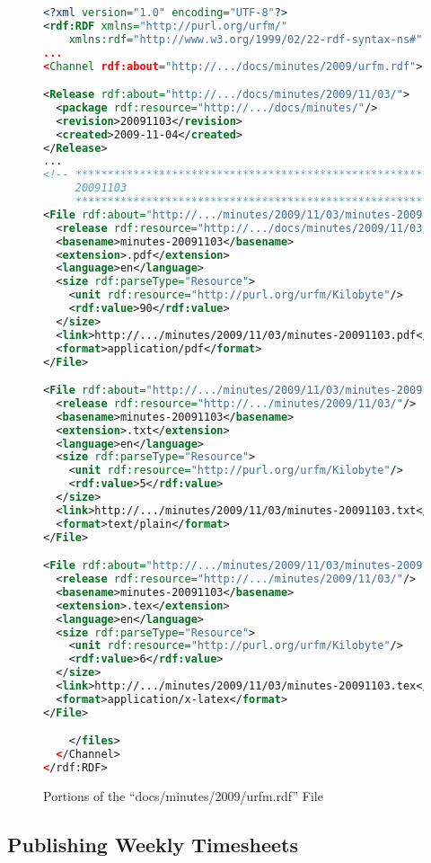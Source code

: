 \begin{figure}\caption{Portions of the ``docs/minutes/2009/urfm.rdf'' File}
\label{WebsitePublishingMinutesMetadataURFM}
\begin{lstlisting}[language=XML]
<?xml version="1.0" encoding="UTF-8"?>
<rdf:RDF xmlns="http://purl.org/urfm/"
    xmlns:rdf="http://www.w3.org/1999/02/22-rdf-syntax-ns#"
...
<Channel rdf:about="http://.../docs/minutes/2009/urfm.rdf">

<Release rdf:about="http://.../docs/minutes/2009/11/03/">
  <package rdf:resource="http://.../docs/minutes/"/>
  <revision>20091103</revision>
  <created>2009-11-04</created>
</Release>
...
<!-- *********************************************************
     20091103                                                 
     ********************************************************* -->
<File rdf:about="http://.../minutes/2009/11/03/minutes-20091103.pdf">
  <release rdf:resource="http://.../docs/minutes/2009/11/03/"/>
  <basename>minutes-20091103</basename>
  <extension>.pdf</extension>
  <language>en</language>
  <size rdf:parseType="Resource">
    <unit rdf:resource="http://purl.org/urfm/Kilobyte"/>
    <rdf:value>90</rdf:value>
  </size>
  <link>http://.../minutes/2009/11/03/minutes-20091103.pdf</link>
  <format>application/pdf</format>
</File>

<File rdf:about="http://.../minutes/2009/11/03/minutes-20091103.txt">
  <release rdf:resource="http://.../minutes/2009/11/03/"/>
  <basename>minutes-20091103</basename>
  <extension>.txt</extension>
  <language>en</language>
  <size rdf:parseType="Resource">
    <unit rdf:resource="http://purl.org/urfm/Kilobyte"/>
    <rdf:value>5</rdf:value>
  </size>
  <link>http://.../minutes/2009/11/03/minutes-20091103.txt</link>
  <format>text/plain</format>
</File>

<File rdf:about="http://.../minutes/2009/11/03/minutes-20091103.tex">
  <release rdf:resource="http://.../minutes/2009/11/03/"/>
  <basename>minutes-20091103</basename>
  <extension>.tex</extension>
  <language>en</language>
  <size rdf:parseType="Resource">
    <unit rdf:resource="http://purl.org/urfm/Kilobyte"/>
    <rdf:value>6</rdf:value>
  </size>
  <link>http://.../minutes/2009/11/03/minutes-20091103.tex</link>
  <format>application/x-latex</format>
</File>

    </files>
  </Channel>
</rdf:RDF>
\end{lstlisting}
\end{figure}

\subsection{Publishing Weekly Timesheets}\label{WebsitePublishingTimesheets}

